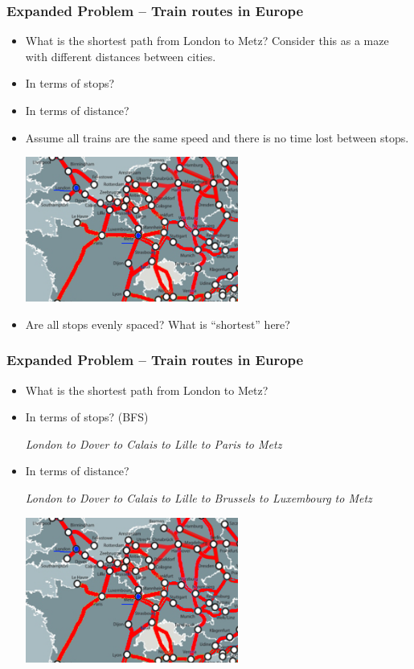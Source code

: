 \documentclass{beamer}
\begin{document}
                \begin{frame}[fragile]
                    \frametitle{Expanded Problem -- Train routes in Europe}
\begin{itemize}
    \item What is the shortest path from London to Metz? Consider this as a maze with different distances between cities.

    \item In terms of stops? 

    \item In terms of distance? 

    \item Assume all trains are the same speed and there is no time lost between stops. 

    \includegraphics[width=7cm]{figures/london_trains.png}

\item Are all stops evenly spaced? What is ``shortest'' here?
\end{itemize}

\end{frame}


\begin{frame}[fragile]
    \frametitle{Expanded Problem -- Train routes in Europe}
\begin{itemize}
\item What is the shortest path from London to Metz?

\item In terms of stops? (BFS)

\textit{London to Dover to Calais to Lille to Paris to Metz}

\item In terms of distance? 

\textit{London to Dover to Calais to Lille to Brussels to Luxembourg to Metz}

\includegraphics[width=7cm]{figures/london_trains.png}

\end{itemize}

\end{frame}
\end{document}
